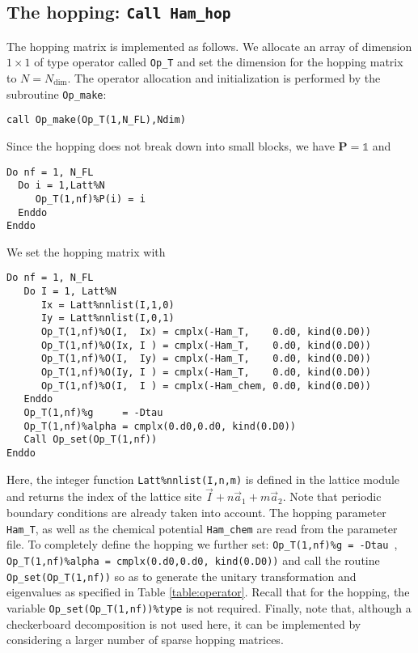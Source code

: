 \subsection{The hopping: \texttt{Call Ham\_hop}} \label{U_PV_Ham_hop}

The hopping matrix is implemented as follows. 
We allocate an array of dimension $1\times 1$ of type operator  called \texttt{Op\_T} and set the  dimension for the hopping  matrix to $N=N_{\mathrm{dim}}$. The operator allocation and initialization is performed by the subroutine \texttt{Op\_make}: 
\begin{lstlisting}[style=fortran]
call Op_make(Op_T(1,N_FL),Ndim)
\end{lstlisting}
Since the hopping  does not  break down into small blocks, we have ${\bm P}=\mathds{1}$   and  
\begin{lstlisting}[style=fortran]
Do nf = 1, N_FL
  Do i = 1,Latt%N
     Op_T(1,nf)%P(i) = i
  Enddo
Enddo
\end{lstlisting}
We set the hopping matrix  with 
\begin{lstlisting}[style=fortran]
Do nf = 1, N_FL
   Do I = 1, Latt%N
      Ix = Latt%nnlist(I,1,0)
      Iy = Latt%nnlist(I,0,1)
      Op_T(1,nf)%O(I,  Ix) = cmplx(-Ham_T,    0.d0, kind(0.D0))
      Op_T(1,nf)%O(Ix, I ) = cmplx(-Ham_T,    0.d0, kind(0.D0))
      Op_T(1,nf)%O(I,  Iy) = cmplx(-Ham_T,    0.d0, kind(0.D0))
      Op_T(1,nf)%O(Iy, I ) = cmplx(-Ham_T,    0.d0, kind(0.D0))
      Op_T(1,nf)%O(I,  I ) = cmplx(-Ham_chem, 0.d0, kind(0.D0))
   Enddo
   Op_T(1,nf)%g     = -Dtau
   Op_T(1,nf)%alpha = cmplx(0.d0,0.d0, kind(0.D0))
   Call Op_set(Op_T(1,nf))
Enddo
\end{lstlisting}
Here, the integer function \texttt{Latt\%nnlist(I,n,m)} is defined in the lattice module and returns the index of the lattice site $ \vec{I} +  n \vec{a}_1 +  m \vec{a}_2$.
Note that periodic boundary conditions are 
already taken into account.  The hopping parameter \texttt{Ham\_T}, as well as the chemical potential \texttt{Ham\_chem} are read from the parameter file.  
To completely define the hopping  we further set: \texttt{Op\_T(1,nf)\%g = -Dtau }, \texttt{Op\_T(1,nf)\%alpha = cmplx(0.d0,0.d0, kind(0.D0))} and call the routine  \texttt{Op\_set(Op\_T(1,nf))}  so as to generate  the unitary transformation and eigenvalues as specified in Table \ref{table:operator}.  Recall that for the hopping, the variable  \texttt{Op\_set(Op\_T(1,nf))\%type} is not required. 
Finally, note that, although a checkerboard decomposition is not used here, it can be implemented by considering a larger number of sparse hopping matrices.  


